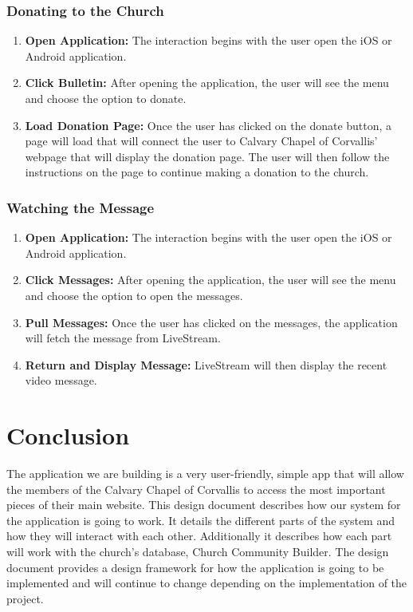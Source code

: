 \documentclass[letterpaper,10pt,draftclsnofoot,onecolumn,titlepage]{IEEEtran}
\begin{document}
			\subsubsection{Donating to the Church}
				\begin{enumerate}
					\item \textbf{Open Application:} The interaction begins with the user open the iOS or Android application.
					\item \textbf{Click Bulletin:} After opening the application, the user will see the menu and choose the option to donate.
					\item \textbf{Load Donation Page:} Once the user has clicked on the donate button, a page will load that will connect the user to Calvary Chapel of Corvallis' webpage that will display the donation page.
					The user will then follow the instructions on the page to continue making a donation to the church.
				\end{enumerate}

			\subsubsection{Watching the Message}
				\begin{enumerate}
					\item \textbf{Open Application:} The interaction begins with the user open the iOS or Android application.
					\item \textbf{Click Messages:} After opening the application, the user will see the menu and choose the option to open the messages.
					\item \textbf{Pull Messages:} Once the user has clicked on the messages, the application will fetch the message from LiveStream.
					\item \textbf{Return and Display Message:} LiveStream will then display the recent video message.
				\end{enumerate}




	\section{Conclusion}
		The application we are building is a very user-friendly, simple app that will allow the members of the Calvary Chapel of Corvallis to access the most important pieces of their main website. 
		This design document describes how our system for the application is going to work. 
		It details the different parts of the system and how they will interact with each other. 
		Additionally it describes how each part will work with the church's database, Church Community Builder. 
		The design document provides a design framework for how the application is going to be implemented and will continue to change depending on the implementation of the project. 
		
	
		
\end{document}
